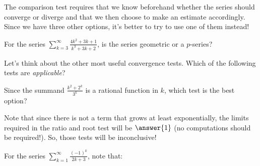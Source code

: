\documentclass{ximera}
\begin{document}
\begin{exercise}
\begin{hint}
\begin{question}
The comparison test requires that we know beforehand whether the series should converge or diverge and that we then choose to make an estimate accordingly.  Since we have three other options, it's better to try to use one of them instead! 
\end{question}



\begin{question}
For the series $\sum_{k=3}^{\infty} \frac{4k^2+3k+1}{k^3+3k+2}$, is the series geometric or a $p$-series?

\begin{multipleChoice}
\end{multipleChoice}

Let's think about the other most useful convergence tests.  Which of the following tests are \emph{applicable}?

\begin{selectAll}
\end{selectAll}

Since the summand $ \frac{k^2+2^k}{3^k}$ is a rational function in $k$, which test is the best option?
\begin{selectAll}
\end{selectAll}
Note that since there is not a term that grows at least exponentially, the limits required in the ratio and root test will be $\answer{1}$ (no computations should be required!).  So, those tests will be inconclusive!


\end{question}

\begin{question}
For the series $\sum_{k=1}^{\infty} \frac{(-1)^k}{2k+3}$, note that:

\begin{multipleChoice}
\end{multipleChoice}


\end{question}
\end{hint}
\end{exercise}
\end{document}
